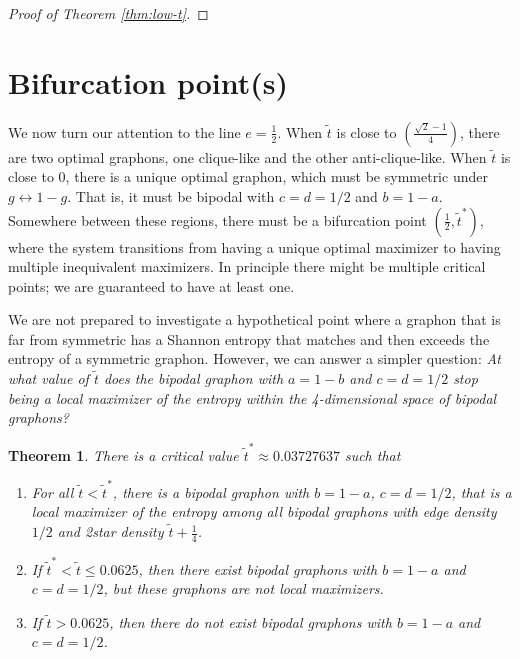 \documentclass[12pt]{amsart}
\newcommand{\1}{\mathbf{1}}
\newtheorem{theorem}[lemma]{Theorem}
\begin{document}
\begin{proof}[Proof of Theorem \ref{thm:low-t}]
\end{proof}

\section{Bifurcation point(s)} \label{sec:bifurcation}

We now turn our attention to the line $e=\frac12$. When $\tilde t$ is close
to $\left ( \frac{\sqrt{2}-1}{4} \right )$, there are two optimal graphons, one clique-like and the other 
anti-clique-like. When $\tilde t$ is close to 0, there is a unique optimal graphon, 
which must be symmetric under $g \leftrightarrow 1-g$. That is, it must
be bipodal with $c=d=1/2$ and $b=1-a$. 
Somewhere between these regions, there must be a bifurcation point 
$(\frac12, \tilde t^*)$, where the system transitions from having a unique 
optimal maximizer to having multiple inequivalent maximizers. In principle there
might be multiple critical points; we are guaranteed to have at least one. 

We are not prepared to investigate a hypothetical point where a 
graphon that is far from symmetric has a Shannon entropy that matches and then exceeds
the entropy of a symmetric graphon. 
However, we can answer a simpler
question: {\em At what value of $\tilde t$ does the bipodal graphon with $a=1-b$ and $c=d=1/2$ stop being a local maximizer
of the entropy within the 4-dimensional space of bipodal graphons?}

\begin{theorem}\label{thm:bifurcation} There is a critical value $\tilde t^* \approx 0.03727637$ such that
\begin{enumerate} 
\item For all $\tilde t < \tilde t^*$, there is a bipodal graphon with $b=1-a$, $c=d=1/2$, 
that is a local maximizer of the entropy among all bipodal graphons with edge density 
$1/2$ and 2star density $\tilde t + \frac14$.
\item If $\tilde t^* < \tilde t \le 0.0625$, then there exist bipodal graphons with $b=1-a$ and
$c=d=1/2$, but these graphons are not local maximizers. 
\item If $\tilde t > 0.0625$, then there do not exist bipodal graphons
  with $b=1-a$ and $c=d=1/2$.
  
\end{enumerate}
\end{theorem}
\end{document}
